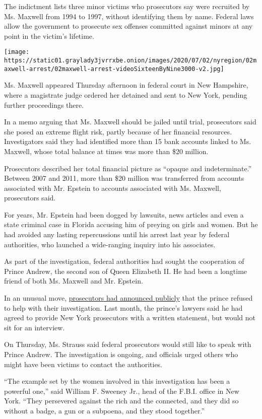 The indictment lists three minor victims who prosecutors say were
recruited by Ms. Maxwell from 1994 to 1997, without identifying them by
name. Federal laws allow the government to prosecute sex offenses
committed against minors at any point in the victim's lifetime.

\texttt{[image: https://static01.graylady3jvrrxbe.onion/images/2020/07/02/nyregion/02maxwell-arrest/02maxwell-arrest-videoSixteenByNine3000-v2.jpg]}

Ms. Maxwell appeared Thursday afternoon in federal court in New
Hampshire, where a magistrate judge ordered her detained and sent to New
York, pending further proceedings there.

In a memo arguing that Ms. Maxwell should be jailed until trial,
prosecutors said she posed an extreme flight risk, partly because of her
financial resources. Investigators said they had identified more than 15
bank accounts linked to Ms. Maxwell, whose total balance at times was
more than \$20 million.

Prosecutors described her total financial picture as ``opaque and
indeterminate.'' Between 2007 and 2011, more than \$20 million was
transferred from accounts associated with Mr. Epstein to accounts
associated with Ms. Maxwell, prosecutors said.

For years, Mr. Epstein had been dogged by lawsuits, news articles and
even a state criminal case in Florida accusing him of preying on girls
and women. But he had avoided any lasting repercussions until his arrest
last year by federal authorities, who launched a wide-ranging inquiry
into his associates.

As part of the investigation, federal authorities had sought the
cooperation of Prince Andrew, the second son of Queen Elizabeth II. He
had been a longtime friend of both Ms. Maxwell and Mr. Epstein.

In an unusual move,
\href{https://www.nytimes3xbfgragh.onion/2020/06/08/nyregion/jeffrey-epstein-prince-andrew.html}{prosecutors
had announced publicly} that the prince refused to help with their
investigation. Last month, the prince's lawyers said he had agreed to
provide New York prosecutors with a written statement, but would not sit
for an interview.

On Thursday, Ms. Strauss said federal prosecutors would still like to
speak with Prince Andrew. The investigation is ongoing, and officials
urged others who might have been victims to contact the authorities.

``The example set by the women involved in this investigation has been a
powerful one,'' said William F. Sweeney Jr., head of the F.B.I. office
in New York. ``They persevered against the rich and the connected, and
they did so without a badge, a gun or a subpoena, and they stood
together.''

